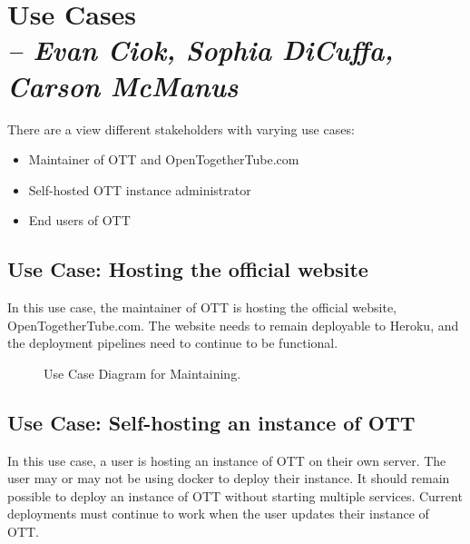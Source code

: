 \chapter{Use Cases \\
  \small{\textit{-- Evan Ciok, Sophia DiCuffa, Carson McManus}}
  \label{Chapter::UseCases}}

There are a view different stakeholders with varying use cases:

\begin{itemize}
	\item Maintainer of OTT and OpenTogetherTube.com
	\item Self-hosted OTT instance administrator
	\item End users of OTT
\end{itemize}

\section{Use Case: Hosting the official website}

In this use case, the maintainer of OTT is hosting the official website, OpenTogetherTube.com. The website needs to remain deployable to Heroku, and the deployment pipelines need to continue to be functional.

\begin{figure}[!htb]
  \centering
  \caption{\label{Figure::gossip-class-diaguse-case-maint} Use Case Diagram for Maintaining.}
\end{figure}


\section{Use Case: Self-hosting an instance of OTT}

In this use case, a user is hosting an instance of OTT on their own server. The user may or may not be using docker to deploy their instance. It should remain possible to deploy an instance of OTT without starting multiple services. Current deployments must continue to work when the user updates their instance of OTT.

